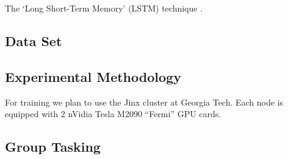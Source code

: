 The `Long Short-Term Memory' (LSTM) technique \TODO{\dots}.
\subsection*{Data Set}
\subsection*{Experimental Methodology}
\TODO{\dots}
For training we plan to use the Jinx cluster at Georgia Tech. Each node is equipped with 2 nVidia Tesla M2090 ``Fermi'' GPU cards.
\subsection*{Group Tasking}
\TODO{\dots}

